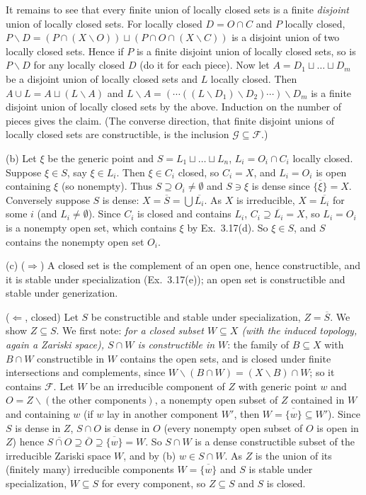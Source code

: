 \documentclass[11pt]{article}
\begin{document}
It remains to see that every finite union of locally closed sets is a finite \emph{disjoint} union of locally closed sets. For locally closed $D=O\cap C$ and $P$ locally closed, $P\smallsetminus D=(P\cap(X\smallsetminus O))\sqcup(P\cap O\cap(X\smallsetminus C))$ is a disjoint union of two locally closed sets. Hence if $P$ is a finite disjoint union of locally closed sets, so is $P\smallsetminus D$ for any locally closed $D$ (do it for each piece). Now let $A=D_1\sqcup\dots\sqcup D_m$ be a disjoint union of locally closed sets and $L$ locally closed. Then $A\cup L=A\sqcup(L\smallsetminus A)$ and $L\smallsetminus A=(\cdots((L\smallsetminus D_1)\smallsetminus D_2)\cdots)\smallsetminus D_m$ is a finite disjoint union of locally closed sets by the above. Induction on the number of pieces gives the claim. (The converse direction, that finite disjoint unions of locally closed sets are constructible, is the inclusion $\mathcal G\subseteq\mathcal F$.)

(b) Let $\xi$ be the generic point and $S=L_1\sqcup\dots\sqcup L_n$, $L_i=O_i\cap C_i$ locally closed. Suppose $\xi\in S$, say $\xi\in L_i$. Then $\xi\in C_i$ closed, so $C_i=X$, and $L_i=O_i$ is open containing $\xi$ (so nonempty). Thus $S\supseteq O_i\ne\emptyset$ and $S\ni\xi$ is dense since $\overline{\{\xi\}}=X$. Conversely suppose $S$ is dense: $X=\overline S=\bigcup\overline{L_i}$. As $X$ is irreducible, $X=\overline{L_i}$ for some $i$ (and $L_i\ne\emptyset$). Since $C_i$ is closed and contains $L_i$, $C_i\supseteq\overline{L_i}=X$, so $L_i=O_i$ is a nonempty open set, which contains $\xi$ by Ex.~3.17(d). So $\xi\in S$, and $S$ contains the nonempty open set $O_i$.

(c) ($\Rightarrow$) A closed set is the complement of an open one, hence constructible, and it is stable under specialization (Ex.~3.17(e)); an open set is constructible and stable under generization.

($\Leftarrow$, closed) Let $S$ be constructible and stable under specialization, $Z=\overline S$. We show $Z\subseteq S$. We first note: \emph{for a closed subset $W\subseteq X$ (with the induced topology, again a Zariski space), $S\cap W$ is constructible in $W$}: the family of $B\subseteq X$ with $B\cap W$ constructible in $W$ contains the open sets, and is closed under finite intersections and complements, since $W\smallsetminus(B\cap W)=(X\smallsetminus B)\cap W$; so it contains $\mathcal F$. Let $W$ be an irreducible component of $Z$ with generic point $w$ and $O=Z\smallsetminus(\text{the other components})$, a nonempty open subset of $Z$ contained in $W$ and containing $w$ (if $w$ lay in another component $W'$, then $W=\overline{\{w\}}\subseteq W'$). Since $S$ is dense in $Z$, $S\cap O$ is dense in $O$ (every nonempty open subset of $O$ is open in $Z$) hence $\overline{S\cap O}\supseteq\overline O\supseteq\overline{\{w\}}=W$. So $S\cap W$ is a dense constructible subset of the irreducible Zariski space $W$, and by (b) $w\in S\cap W$. As $Z$ is the union of its (finitely many) irreducible components $W=\overline{\{w\}}$ and $S$ is stable under specialization, $W\subseteq S$ for every component, so $Z\subseteq S$ and $S$ is closed.
\end{document}
